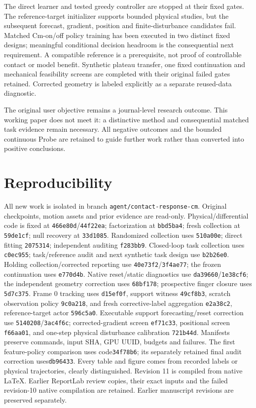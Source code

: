 \documentclass[10pt]{article}
\begin{document}
The direct learner and tested greedy controller are stopped at their fixed gates.
The reference-target initializer supports bounded physical studies, but the
subsequent forecast, gradient, position and finite-disturbance candidates fail.
Matched Cm-on/off policy training has been executed in two distinct fixed designs;
meaningful conditional decision headroom is the consequential next requirement. A compatible reference is a
prerequisite, not proof of controllable contact or model benefit. Synthetic plateau transfer, one fixed continuation and mechanical feasibility
screens are completed with their original failed gates retained. Corrected geometry
is labeled explicitly as a separate reused-data diagnostic.

The original user objective remains a journal-level research outcome. This working
paper does not meet it: a distinctive method and consequential matched task evidence
remain necessary. All negative outcomes and the bounded continuous Probe are retained
to guide further work rather than converted into positive conclusions.

\section*{Reproducibility}
All new work is isolated in branch \texttt{agent/contact-response-cm}. Original
checkpoints, motion assets and prior evidence are read-only. Physical/differential
code is fixed at \texttt{466e80d}/\texttt{44f22ea}; factorization at
\texttt{bbd5ba4}; fresh collection at \texttt{59de1cf}; null recovery at
\texttt{33d1085}. Randomized collection uses \texttt{510a00e}; direct fitting
\texttt{2075314}; independent auditing \texttt{f283bb9}. Closed-loop task
collection uses \texttt{c0ec955}; task/reference audit and next synthetic task
design use \texttt{b2b26e0}. Holding collection/corrected reporting use
\texttt{40e73f2}/\texttt{3f4ae77}; the frozen continuation uses \texttt{e770d4b}.
Native reset/static diagnostics use \texttt{da39660}/\texttt{1e38cf6}; the independent
geometry correction uses \texttt{68bf178}; prospective finger closure uses \texttt{5d7c375}. Frame 0 tracking uses \texttt{d15ef0f},
support witness \texttt{49cf8b3}, scratch observation policy \texttt{9c0a218}, and
fresh corrective-label aggregation \texttt{e2a38c2}, reference-target actor \texttt{596c5a0}.
Executable support forecasting/reset correction use \texttt{5140208}/\texttt{3ac4f6c};
corrected-gradient screen \texttt{ef71c33}, positional screen \texttt{f66aa01},
and one-step physical disturbance calibration \texttt{721b44d}.
Manifests preserve commands, input SHA, GPU UUID,
budgets and failures. The first feature-policy comparison uses code\texttt{34f78b6}; its separately
retained final audit correction uses\texttt{db96433}.
Every table and figure comes from recorded labels or physical trajectories, clearly distinguished.
Revision 11 is compiled from native LaTeX. Earlier ReportLab review copies,
their exact inputs and the failed revision-10 native compilation are retained. Earlier manuscript revisions are preserved separately.
\end{document}

